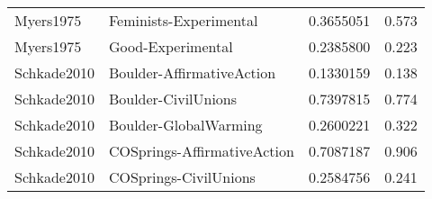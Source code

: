 \begin{longtable}{llrr}
Myers1975 & Feminists-Experimental & 0.3655051 & 0.573\\
Myers1975 & Good-Experimental & 0.2385800 & 0.223\\
\addlinespace
Schkade2010 & Boulder-AffirmativeAction & 0.1330159 & 0.138\\
Schkade2010 & Boulder-CivilUnions & 0.7397815 & 0.774\\
Schkade2010 & Boulder-GlobalWarming & 0.2600221 & 0.322\\
Schkade2010 & COSprings-AffirmativeAction & 0.7087187 & 0.906\\
Schkade2010 & COSprings-CivilUnions & 0.2584756 & 0.241\\
\bottomrule
\end{longtable}
